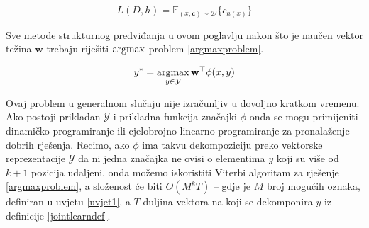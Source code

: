 \begin{equation} \label{funcloss}
  L(D, h) = \mathbb{E}_{(x, \mathbf{c}) \sim \mathcal{D}} \{c_{h(x)}\}
\end{equation}

Sve metode strukturnog predviđanja u ovom poglavlju nakon što je naučen vektor
težina $\mathbf{w}$ trebaju riješiti $\operatorname*{argmax}$ problem \ref{argmaxproblem}.

\begin{equation} \label{argmaxproblem}
  y\ssymbol{1} = \argmax_{y \in \mathcal{Y}} \mathbf{w}^\top \phi(x, y)
\end{equation}

Ovaj problem u generalnom slučaju nije izračunljiv u dovoljno kratkom vremenu.
Ako postoji prikladan $\mathcal{Y}$ i prikladna funkcija značajki $\phi$ onda se
mogu primijeniti dinamičko programiranje  ili
cjelobrojno linearno programiranje  za
pronalaženje dobrih rješenja. Recimo, ako $\phi$ ima takvu dekompoziciju preko
vektorske reprezentacije $\mathcal{Y}$ da ni jedna značajka ne ovisi o
elementima $y$ koji su više od $k+1$ pozicija udaljeni, onda možemo iskoristiti
Viterbi algoritam za rješenje \ref{argmaxproblem}, a složenost će biti $O(M^k
T)$ -- gdje je $M$ broj mogućih oznaka, definiran u uvjetu \ref{uvjet1}, a $T$
duljina vektora na koji se dekomponira $y$ iz definicije \ref{jointlearndef}.
